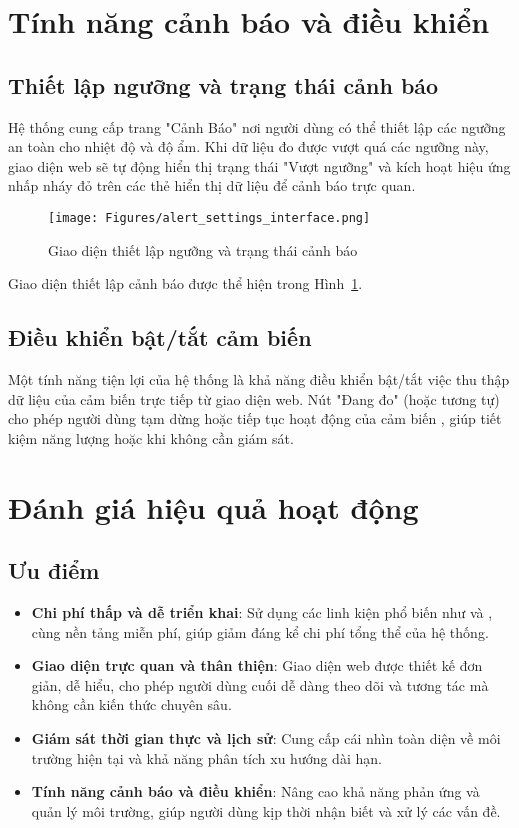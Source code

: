 \section{Tính năng cảnh báo và điều khiển}
\subsection{Thiết lập ngưỡng và trạng thái cảnh báo}
Hệ thống cung cấp trang "Cảnh Báo" nơi người dùng có thể thiết lập các ngưỡng an toàn cho nhiệt độ và độ ẩm. Khi dữ liệu đo được vượt quá các ngưỡng này, giao diện web sẽ tự động hiển thị trạng thái "Vượt ngưỡng" và kích hoạt hiệu ứng nhấp nháy đỏ trên các thẻ hiển thị dữ liệu để cảnh báo trực quan.

\begin{figure}[hbtp]
	\centering
	\texttt{[image: Figures/alert\_settings\_interface.png]} %
	\caption{Giao diện thiết lập ngưỡng và trạng thái cảnh báo}
	\label{fig:alert_settings}
\end{figure}
Giao diện thiết lập cảnh báo được thể hiện trong Hình~\ref{fig:alert_settings}.

\subsection{Điều khiển bật/tắt cảm biến}
Một tính năng tiện lợi của hệ thống là khả năng điều khiển bật/tắt việc thu thập dữ liệu của cảm biến trực tiếp từ giao diện web. Nút "Đang đo" (hoặc tương tự) cho phép người dùng tạm dừng hoặc tiếp tục hoạt động của cảm biến , giúp tiết kiệm năng lượng hoặc khi không cần giám sát.

\section{Đánh giá hiệu quả hoạt động}
\subsection{Ưu điểm}
\begin{itemize}
	\item \textbf{Chi phí thấp và dễ triển khai}: Sử dụng các linh kiện phổ biến như  và , cùng nền tảng  miễn phí, giúp giảm đáng kể chi phí tổng thể của hệ thống.
	\item \textbf{Giao diện trực quan và thân thiện}: Giao diện web được thiết kế đơn giản, dễ hiểu, cho phép người dùng cuối dễ dàng theo dõi và tương tác mà không cần kiến thức chuyên sâu.
	\item \textbf{Giám sát thời gian thực và lịch sử}: Cung cấp cái nhìn toàn diện về môi trường hiện tại và khả năng phân tích xu hướng dài hạn.
	\item \textbf{Tính năng cảnh báo và điều khiển}: Nâng cao khả năng phản ứng và quản lý môi trường, giúp người dùng kịp thời nhận biết và xử lý các vấn đề.
\end{itemize}

